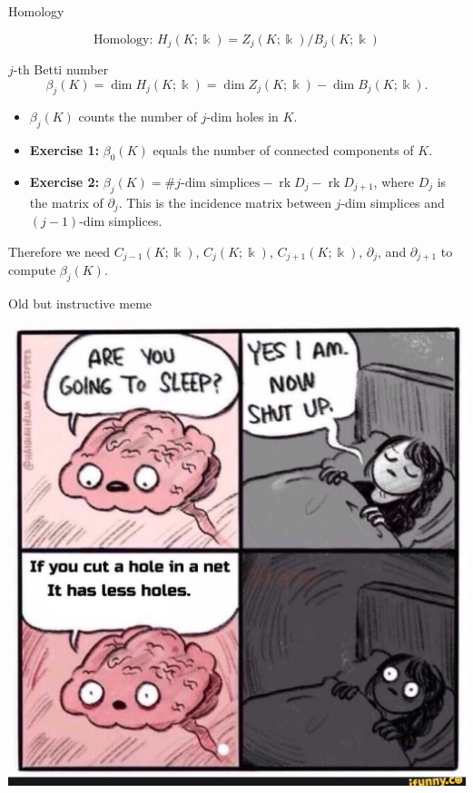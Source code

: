 \documentclass[10pt]{beamer}
\DeclareMathOperator{\rk}{rk}
\newcommand{\ko}{\Bbbk}
\newcommand{\dd}{\partial}
\begin{document}
\begin{frame}{Homology}

\[
\mbox{Homology: }
H_j(K;\ko)=Z_j(K;\ko)/B_j(K;\ko)
\]

$j$-th Betti number
\[
\beta_j(K)=\dim H_j(K;\ko) = \dim Z_j(K;\ko) - \dim B_j(K;\ko).
\]

\begin{itemize}
  \item $\beta_j(K)$ counts the number of $j$-dim holes in $K$.\pause
  \item \textbf{Exercise 1:} $\beta_0(K)$ equals the number of connected components of $K$.\pause
  \item \textbf{Exercise 2:} $\beta_j(K)=\# j\mbox{-dim simplices}-\rk D_j - \rk D_{j+1}$, where $D_j$ is the matrix of $\dd_j$. This is the incidence matrix between $j$-dim simplices and $(j-1)$-dim simplices.
\end{itemize}

Therefore we need $C_{j-1}(K;\ko)$, $C_{j}(K;\ko)$, $C_{j+1}(K;\ko)$, $\dd_j$, and $\dd_{j+1}$ to compute $\beta_j(K)$.

\end{frame}

\begin{frame}{Old but instructive meme}

\begin{center}
\includegraphics[scale=0.2]{pictures/meme.jpg}
\end{center}

\end{frame}
\end{document}
